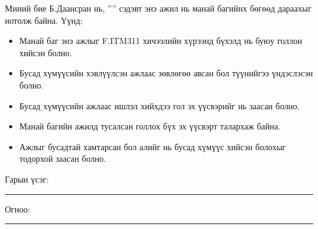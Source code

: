 \begin{declaration}
\addchaptertocentry{\authorshipname}

\noindent \qquad Миний бие Б.Даансран  нь, ''{\ttitle}'' сэдэвт энэ ажил нь манай багийнх бөгөөд дараахыг нотолж байна. Үүнд:

\begin{itemize} 
\item Манай баг энэ ажлыг F.ITM311 хичээлийн хүрээнд бүхэлд нь буюу голлон хийсэн болно.
\item Бусад хүмүүсийн хэвлүүлсэн ажлаас зөвлөгөө авсан бол түүнийгээ үндэслэсэн болно.
\item Бусад хүмүүсийн ажлаас ишлэл хийхдээ гол эх үүсвэрийг нь заасан болно.
\item Манай багийн ажилд тусалсан голлох бүх эх үүсвэрт талархаж байна.
\item Ажлыг бусадтай хамтарсан бол алийг нь бусад хүмүүс хийсэн болохыг тодорхой заасан болно.
\end{itemize}
\bigskip
 
\noindent Гарын үсэг: \rule[-0.5em]{12.7em}{0.5pt}
\bigskip

\noindent Огноо: \rule[-0.5em]{15em}{0.5pt}

\end{declaration}

\clearpage

